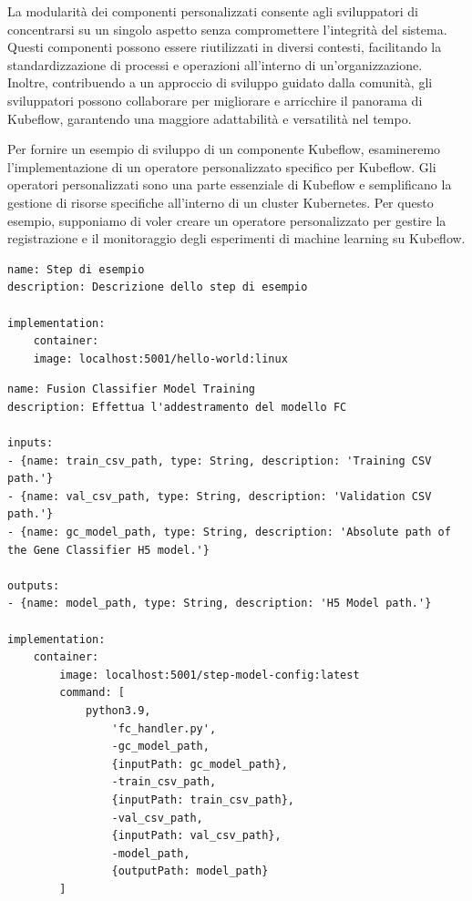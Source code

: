 La modularità dei componenti personalizzati consente agli sviluppatori di concentrarsi su un singolo aspetto senza compromettere l'integrità del sistema. Questi componenti possono essere riutilizzati in diversi contesti, facilitando la standardizzazione di processi e operazioni all'interno di un'organizzazione. Inoltre, contribuendo a un approccio di sviluppo guidato dalla comunità, gli sviluppatori possono collaborare per migliorare e arricchire il panorama di Kubeflow, garantendo una maggiore adattabilità e versatilità nel tempo.

Per fornire un esempio di sviluppo di un componente Kubeflow, esamineremo l'implementazione di un operatore personalizzato specifico per Kubeflow. Gli operatori personalizzati sono una parte essenziale di Kubeflow e semplificano la gestione di risorse specifiche all'interno di un cluster Kubernetes. Per questo esempio, supponiamo di voler creare un operatore personalizzato per gestire la registrazione e il monitoraggio degli esperimenti di machine learning su Kubeflow.

\begin{code}
\label{code:apx:a:python}
\begin{verbatim}
name: Step di esempio
description: Descrizione dello step di esempio
    
implementation:
    container:
    image: localhost:5001/hello-world:linux
\end{verbatim}
\end{code}

\begin{code}
\label{code:apx:a:python}
\begin{verbatim}
name: Fusion Classifier Model Training
description: Effettua l'addestramento del modello FC
    
inputs:
- {name: train_csv_path, type: String, description: 'Training CSV path.'}
- {name: val_csv_path, type: String, description: 'Validation CSV path.'}
- {name: gc_model_path, type: String, description: 'Absolute path of the Gene Classifier H5 model.'}
    
outputs:
- {name: model_path, type: String, description: 'H5 Model path.'}
    
implementation:
    container:
        image: localhost:5001/step-model-config:latest
        command: [
            python3.9,
                'fc_handler.py',
                -gc_model_path, 
                {inputPath: gc_model_path},
                -train_csv_path, 
                {inputPath: train_csv_path},
                -val_csv_path, 
                {inputPath: val_csv_path},
                -model_path, 
                {outputPath: model_path}
        ]
\end{verbatim}
\end{code}

